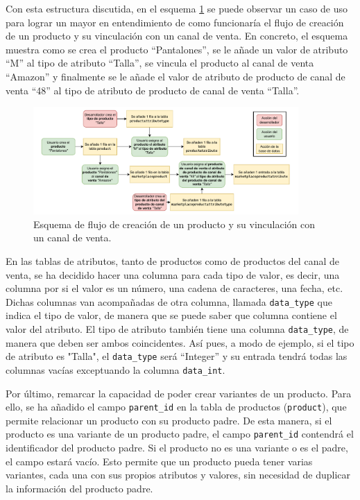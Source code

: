 Con esta estructura discutida, en el esquema \ref{fig:products_db_diagram} se puede observar un caso de uso para lograr un mayor en entendimiento de como funcionaría el flujo de creación de un producto y su vinculación con un canal de venta. En concreto, el esquema muestra como se crea el producto ``Pantalones'', se le añade un valor de atributo ``M'' al tipo de atributo ``Talla'', se vincula el producto al canal de venta ``Amazon'' y finalmente se le añade el valor de atributo de producto de canal de venta ``48'' al tipo de atributo de producto de canal de venta ``Talla''.

\begin{figure}[H]
    \centering
    \includegraphics[width=0.9\textwidth]{figures/design_develop/products_db_diagram.pdf}
    \caption{Esquema de flujo de creación de un producto y su vinculación con un canal de venta.}
    \label{fig:products_db_diagram}
\end{figure}

En las tablas de atributos, tanto de productos como de productos del canal de venta, se ha decidido hacer una columna para cada tipo de valor, es decir, una columna por si el valor es un número, una cadena de caracteres, una fecha, etc. Dichas columnas van acompañadas de otra columna, llamada \texttt{data\_type} que indica el tipo de valor, de manera que se puede saber que columna contiene el valor del atributo. El tipo de atributo también tiene una columna \texttt{data\_type}, de manera que deben ser ambos coincidentes. Así pues, a modo de ejemplo, si el tipo de atributo es "Talla", el \texttt{data\_type} será ``Integer'' y su entrada tendrá todas las columnas vacías exceptuando la columna \texttt{data\_int}.

Por último, remarcar la capacidad de poder crear variantes de un producto. Para ello, se ha añadido el campo \texttt{parent\_id} en la tabla de productos (\texttt{product}), que permite relacionar un producto con su producto padre. De esta manera, si el producto es una variante de un producto padre, el campo \texttt{parent\_id} contendrá el identificador del producto padre. Si el producto no es una variante o es el padre, el campo estará vacío. Esto permite que un producto pueda tener varias variantes, cada una con sus propios atributos y valores, sin necesidad de duplicar la información del producto padre.

